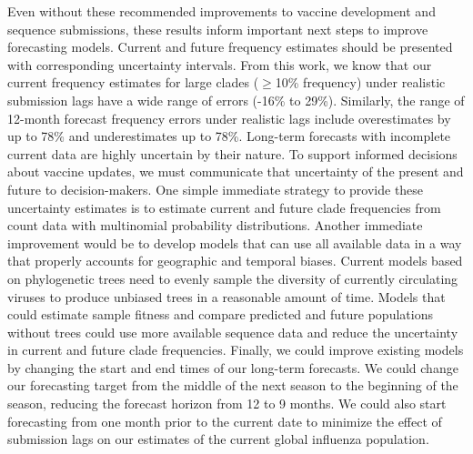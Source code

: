 \documentclass[9pt,lineno]{elife}
\begin{document}
Even without these recommended improvements to vaccine development and sequence submissions, these results inform important next steps to improve forecasting models.
Current and future frequency estimates should be presented with corresponding uncertainty intervals.
From this work, we know that our current frequency estimates for large clades ($\ge$10\% frequency) under realistic submission lags have a wide range of errors (-16\% to 29\%).
Similarly, the range of 12-month forecast frequency errors under realistic lags include overestimates by up to 78\% and underestimates up to 78\%.
Long-term forecasts with incomplete current data are highly uncertain by their nature.
To support informed decisions about vaccine updates, we must communicate that uncertainty of the present and future to decision-makers.
One simple immediate strategy to provide these uncertainty estimates is to estimate current and future clade frequencies from count data with multinomial probability distributions.
Another immediate improvement would be to develop models that can use all available data in a way that properly accounts for geographic and temporal biases.
Current models based on phylogenetic trees need to evenly sample the diversity of currently circulating viruses to produce unbiased trees in a reasonable amount of time.
Models that could estimate sample fitness and compare predicted and future populations without trees could use more available sequence data and reduce the uncertainty in current and future clade frequencies.
Finally, we could improve existing models by changing the start and end times of our long-term forecasts.
We could change our forecasting target from the middle of the next season to the beginning of the season, reducing the forecast horizon from 12 to 9 months.
We could also start forecasting from one month prior to the current date to minimize the effect of submission lags on our estimates of the current global influenza population.
\end{document}
